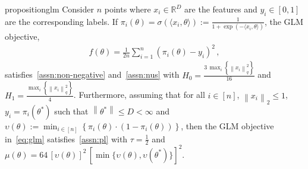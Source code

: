 \documentclass{article}
\newcommand{\normsq}[1]{\left\|#1 \right\|^{2}}
\newcommand{\norm}[1]{\left\|#1 \right\|}
\newcommand{\R}{\mathbb{R}}
\begin{document}
\begin{restatable}{proposition}{glm}
Consider $n$ points where $x_i \in \R^D$ are the features and $y_i \in [0,1]$ are the corresponding labels. If $\pi_i(\theta) = \sigma(\langle x_i, \theta \rangle) := \frac{1}{1 + \exp(-\langle x_i, \theta \rangle)}$, the GLM objective,
\begin{align}
f(\theta) = \frac{1}{2n} \sum_{i = 1}^{n} \left(\pi_i(\theta) - y_i \right)^2 \,,
\label{eq:glm}    
\end{align}
satisfies~\cref{assn:non-negative} and~\cref{assn:nus} with $H_0 = \frac{3 \, \max_i \left\{\normsq{x_i}_{q}\right\}}{16}$ and $H_1 =  \frac{\max_i \left\{\normsq{x_i}_{q}\right\}}{4} $. Furthermore, assuming that for all $i \in [n]$, $\norm{x_i}_2 \leq 1$, $y_i = \pi_i(\theta^*)$ such that $\norm{\theta^*} \leq D < \infty$ and $\upsilon(\theta) := \min_{i \in [n]}{ \left\{ \pi_i(\theta) \cdot \left( 1 - \pi_i(\theta) \right) \right\} }$, then the GLM objective in~\cref{eq:glm}  satisfies~\cref{assn:pl} with $\tau = \frac{1}{2}$ and $\mu(\theta) = 64 \, [\upsilon(\theta)]^2 \, [\min \{\upsilon(\theta), \upsilon(\theta^*) \}]^2$. 
\label{prop:glm}
\end{restatable}
\end{document}
